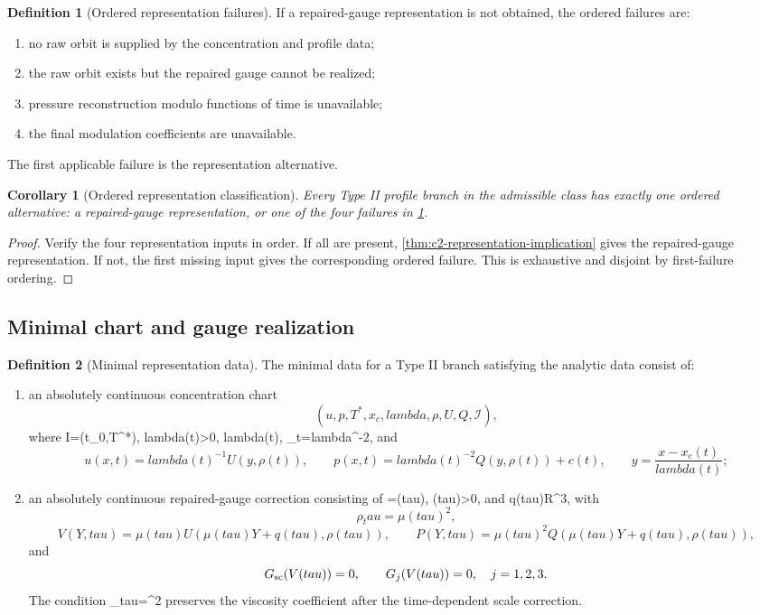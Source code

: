 \documentclass[11pt]{amsart}
\def\({}%
\def\){}%
\def\mathbb#1{#1}%
\def\tau{tau}%
\def\lambda{lambda}%
\theoremstyle{plain}
\newtheorem{corollary}[corollary]{Corollary}
\theoremstyle{definition}
\newtheorem{definition}[definition]{Definition}
\theoremstyle{remark}
\begin{document}
\begin{definition}[Ordered representation failures]
\label{def:c2-representation-failures}
If a repaired-gauge representation is not obtained, the ordered failures are:
\begin{enumerate}[label=\textup{(\roman*)}]
\item no raw orbit is supplied by the concentration and profile data;
\item the raw orbit exists but the repaired gauge cannot be realized;
\item pressure reconstruction modulo functions of time is unavailable;
\item the final modulation coefficients are unavailable.
\end{enumerate}
The first applicable failure is the representation alternative.
\end{definition}

\begin{corollary}[Ordered representation classification]
\label{cor:c2-ordered-representation}
Every Type II profile branch in the admissible class has exactly one ordered
alternative: a repaired-gauge representation, or one of the four failures in
\cref{def:c2-representation-failures}.
\end{corollary}

\begin{proof}
Verify the four representation inputs in order.  If all are present,
\cref{thm:c2-representation-implication} gives the repaired-gauge
representation.  If not, the first missing input gives the corresponding
ordered failure.  This is exhaustive and disjoint by first-failure ordering.
\end{proof}

\subsection{Minimal chart and gauge realization}

\begin{definition}[Minimal representation data]
\label{def:c2r-minimal-representation-data}
The minimal data for a Type II branch satisfying the analytic data consist of:
\begin{enumerate}[label=\textup{(\roman*)}]
\item an absolutely continuous concentration chart
\[
  (u,p,T^*,x_c,\lambda,\rho,U,Q,\mathcal I),
\]
where \(\mathcal I=(t_0,T^*)\), \(\lambda(t)>0\), \(\lambda(t)\),
\(\rho_t=\lambda^{-2}\), and
\[
  u(x,t)=\lambda(t)^{-1}U(y,\rho(t)),\qquad
  p(x,t)=\lambda(t)^{-2}Q(y,\rho(t))+c(t),\qquad
  y=\frac{x-x_c(t)}{\lambda(t)};
\]
\item an absolutely continuous repaired-gauge correction consisting of
\(\rho=\rho(\tau)\), \(\mu(\tau)>0\), and \(q(\tau)\in\mathbb R^3\), with
\[
  \rho_\tau=\mu(\tau)^2,
\]
\[
  V(Y,\tau)=\mu(\tau)U(\mu(\tau)Y+q(\tau),\rho(\tau)),\qquad
  P(Y,\tau)=\mu(\tau)^2Q(\mu(\tau)Y+q(\tau),\rho(\tau)),
\]
and
\[
  G_{\rm sc}(V(\tau))=0,\qquad
  G_j(V(\tau))=0,\quad j=1,2,3.
\]
The condition \(\rho_\tau=\mu^2\) preserves the viscosity coefficient after the
time-dependent scale correction.
\end{enumerate}
\end{definition}
\end{document}
